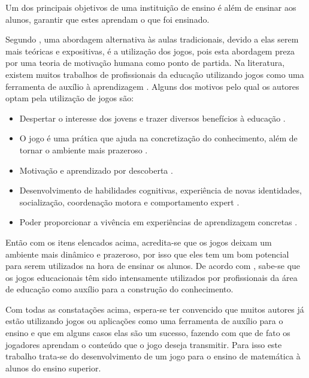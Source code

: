 Um dos principais objetivos de uma instituição de ensino é além de ensinar aos alunos, garantir que estes aprendam o que foi ensinado. 

Segundo , uma abordagem alternativa às aulas tradicionais, devido  a elas serem mais teóricas e expositivas, é a utilização dos jogos, pois esta abordagem preza por uma teoria de motivação humana como ponto de partida. Na literatura, existem muitos trabalhos de profissionais da educação utilizando jogos como uma ferramenta de auxílio à aprendizagem \cite[p. 3]{sucessoJogoEngSoft}. Alguns dos motivos pelo qual os autores optam pela utilização de jogos são:

\begin{itemize}
	\item Despertar o interesse dos jovens e trazer diversos benefícios à educação \cite{appcalculo}.
	\item O jogo é uma prática que ajuda na concretização do conhecimento, além de tornar o ambiente mais prazeroso \cite{jogoPratPedagoc}. 
	\item Motivação e aprendizado por descoberta .
	\item Desenvolvimento de habilidades cognitivas, experiência de novas identidades, socialização, coordenação motora e comportamento expert \cite[p. 3 e 4]{savi}.
	\item Poder proporcionar a vivência em experiências de aprendizagem concretas .
\end{itemize}

Então com os itens elencados acima, acredita-se que os jogos deixam um ambiente mais dinâmico e prazeroso, por isso que eles tem um bom potencial para serem utilizados na hora de ensinar os alunos. De acordo com \cite{nunesParreira}, sabe-se que os jogos educacionais têm sido intensamente utilizados por profissionais da área de educação como auxílio para a construção do conhecimento.


Com todas as constatações acima, espera-se ter convencido que muitos autores já estão utilizando jogos ou aplicações como uma ferramenta de auxílio para o ensino e que em alguns casos elas são um sucesso, fazendo com que de fato os jogadores aprendam o conteúdo que o jogo deseja transmitir. Para isso este trabalho trata-se do desenvolvimento de um jogo para o ensino de matemática à alunos do ensino superior.

